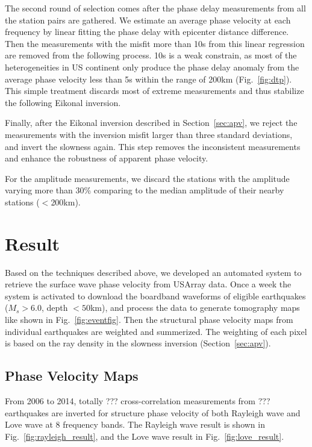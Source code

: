 \documentclass[referee]{gji}
\begin{document}
The second round of selection comes after the phase delay measurements from all the station pairs are gathered. We estimate an average phase velocity at each frequency by linear fitting the phase delay with epicenter distance difference. Then the measurements with the misfit more than 10s from this linear regression are removed from the following process. 10s is a weak constrain, as most of the heterogeneities in US continent only produce the phase delay anomaly from the average phase velocity less than 5s within the range of 200km (Fig.~\ref{fig:dtp}). This simple treatment discards most of extreme measurements and thus stabilize the following Eikonal inversion.

Finally, after the Eikonal inversion described in Section~\ref{sec:apv}, we reject the measurements with the inversion misfit larger than three standard deviations, and invert the slowness again. This step removes the inconsistent measurements and enhance the robustness of apparent phase velocity. 

For the amplitude measurements, we discard the stations with the amplitude varying more than 30\% comparing to the median amplitude of their nearby stations ($<$200km).   


\section{Result}

Based on the techniques described above, we developed an automated system to retrieve the surface wave phase velocity from USArray data. Once a week the system is activated to download the boardband waveforms of eligible earthquakes ($M_s > 6.0$, depth $<50$km), and process the data to generate tomography maps like shown in Fig.~\ref{fig:eventfig}. Then the structural phase velocity maps from individual earthquakes are weighted and summerized. The weighting of each pixel is based on the ray density in the slowness inversion (Section~\ref{sec:apv}).

\subsection{Phase Velocity Maps}

From 2006 to 2014, totally ??? cross-correlation measurements from ??? earthquakes are inverted for structure phase velocity of both Rayleigh wave and Love wave at 8 frequency bands. The Rayleigh wave result is shown in Fig.~\ref{fig:rayleigh_result}, and the Love wave result in Fig.~\ref{fig:love_result}. 
\end{document}
